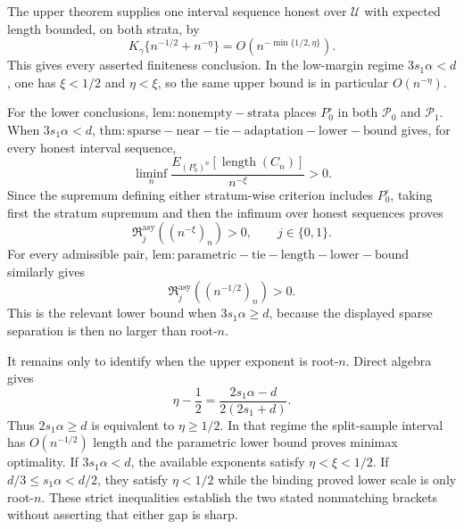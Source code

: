 The upper theorem supplies one interval sequence honest over \(\mathcal U\) with expected length bounded, on both strata, by
\[
 K_\gamma\{n^{-1/2}+n^{-\eta}\}
 =O(n^{-\min\{1/2,\eta\}}).
\]
This gives every asserted finiteness conclusion.  In the low-margin regime \(3s_1\alpha<d\), one has \(\xi<1/2\) and \(\eta<\xi\), so the same upper bound is in particular \(O(n^{-\eta})\).

For the lower conclusions, \(\mathrm{lem:nonempty-strata}\) places \(P_0^\circ\) in both \(\mathcal P_0\) and \(\mathcal P_1\).  When \(3s_1\alpha<d\), \(\mathrm{thm:sparse-near-tie-adaptation-lower-bound}\) gives, for every honest interval sequence,
\[
 \liminf_n
 \frac{E_{(P_0^\circ)^n}[\operatorname{length}(C_n)]}{n^{-\xi}}>0.
\]
Since the supremum defining either stratum-wise criterion includes \(P_0^\circ\), taking first the stratum supremum and then the infimum over honest sequences proves
\[
 \mathfrak R_j^{\mathrm{asy}}((n^{-\xi})_n)>0,
 \qquad j\in\{0,1\}.
\]
For every admissible pair, \(\mathrm{lem:parametric-tie-length-lower-bound}\) similarly gives
\[
 \mathfrak R_j^{\mathrm{asy}}((n^{-1/2})_n)>0.
\]
This is the relevant lower bound when \(3s_1\alpha\ge d\), because the displayed sparse separation is then no larger than root-\(n\).

It remains only to identify when the upper exponent is root-\(n\).  Direct algebra gives
\[
 \eta-\frac12
 =\frac{2s_1\alpha-d}{2(2s_1+d)}.
\]
Thus \(2s_1\alpha\ge d\) is equivalent to \(\eta\ge1/2\).  In that regime the split-sample interval has \(O(n^{-1/2})\) length and the parametric lower bound proves minimax optimality.  If \(3s_1\alpha<d\), the available exponents satisfy \(\eta<\xi<1/2\).  If \(d/3\le s_1\alpha<d/2\), they satisfy \(\eta<1/2\) while the binding proved lower scale is only root-\(n\).  These strict inequalities establish the two stated nonmatching brackets without asserting that either gap is sharp.